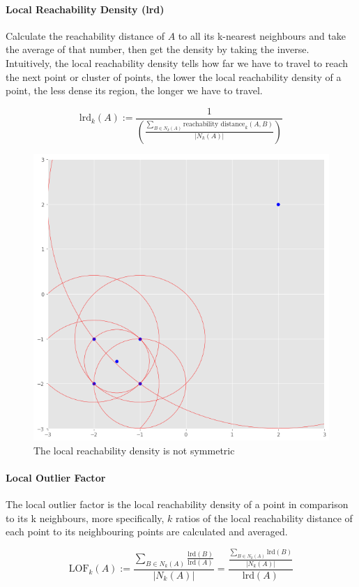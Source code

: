 \documentclass[a4paper, 11pt]{article}
\begin{document}
\paragraph{Local Reachability Density (lrd)}

Calculate the reachability distance of $A$ to all its k-nearest neighbours and take the average of that number, then get the density by taking the inverse. Intuitively, the local reachability density tells how far we have to travel to reach the next point or cluster of points, the lower the local reachability density of a point, the less dense its region, the longer we have to travel.

\begin{equation}
    \text{lrd}_k (A) :=
    \frac{1}{
        \left(
        \frac{
            \sum_{B\in N_k (A)} \text{reachability distance}_k (A,B)
        }{|N_k(A)|}
        \right)
    }
\end{equation}

\begin{figure}[tbh!]
    \centering
    \includegraphics[width=0.5\linewidth, keepaspectratio]{Pictures/outlier_reachability_density}
    \caption{The local reachability density is not symmetric}
    \label{fig:outlierreachabilitydensity}
\end{figure}

\paragraph{Local Outlier Factor}

The local outlier factor is the local reachability density of a point in comparison to its k neighbours, more specifically, $k$ ratios of the local reachability distance of each point to its neighbouring points are calculated and averaged.

\begin{equation}
    \text{LOF}_k(A):= \frac{\sum_{B\in N_k (A)} \frac{\text{lrd}(B)}{\text{lrd}(A)}}{|N_k(A)|} = \frac{\frac{\sum_{B\in N_k (A)} \text{lrd}(B)}{|N_k(A)|}}{\text{lrd}(A)}
\end{equation}
\end{document}
